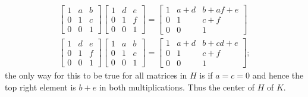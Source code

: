 \documentclass[a4paper,12pt]{article}
\begin{document}
\begin{enumerate}
        \begin{align*}
            \left[ \begin{array}{ccc}
                    1 & a & b \\
                    0 & 1 & c \\
                    0 & 0 & 1
            \end{array} \right]
            \left[ \begin{array}{ccc}
                    1 & d & e \\
                    0 & 1 & f \\
                    0 & 0 & 1
            \end{array} \right]
            = \left[ \begin{array}{ccc}
                    1 & a + d & b + af + e \\
                    0 & 1 & c + f \\
                    0 & 0 & 1
            \end{array} \right] \\
            \left[ \begin{array}{ccc}
                    1 & d & e \\
                    0 & 1 & f \\
                    0 & 0 & 1
            \end{array} \right]
            \left[ \begin{array}{ccc}
                    1 & a & b \\
                    0 & 1 & c \\
                    0 & 0 & 1
            \end{array} \right]
            = \left[ \begin{array}{ccc}
                    1 & a + d & b + cd + e \\
                    0 & 1 & c + f \\
                    0 & 0 & 1
            \end{array} \right];
        \end{align*}
        the only way for this to be true for all matrices in $H$ is if $a = c = 0$ and hence the top right element is $b + e$ in both multiplications. Thus the center of $H$ of $K$.
\end{enumerate}
\end{document}
